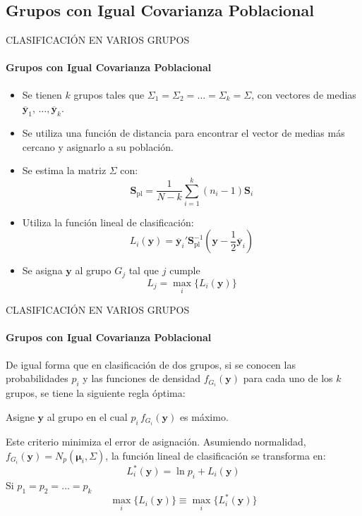 \subsection{Grupos con Igual Covarianza Poblacional}
\begin{frame}{CLASIFICACIÓN EN VARIOS GRUPOS}
\framesubtitle{Grupos con Igual Covarianza Poblacional}
    \begin{itemize}
        \item Se tienen $k$ grupos tales que $\Sigma_1=\Sigma_2=\dots=\Sigma_k=\Sigma$, con vectores de medias $\mathbf{\overbar{y}}_1,\,\dots,\mathbf{\overbar{y}}_k$.
        \item Se utiliza una función de distancia para encontrar el vector de medias más cercano y asignarlo a su población.
        \item Se estima la matriz $\Sigma$ con:
        \begin{equation}
         \mathbf{S}_{\text{pl}}=\dfrac{1}{N-k}\sum_{i=1}^k(n_i-1)\mathbf{S}_i
        \end{equation}
        \item Utiliza la función lineal de clasificación:
        \begin{equation}
            L_i(\mathbf{y})=\mathbf{\overbar{y}}_i'\mathbf{S}_{\text{pl}}^{-1}\left(\mathbf{y}-\dfrac{1}{2}\mathbf{\overbar{y}}_i\right)
        \end{equation}
        \item Se asigna $\mathbf{y}$ al grupo $G_{j}$ tal que $j$ cumple
        \begin{equation}
            L_j=\max_{i}\{L_i(\mathbf{y})\}
        \end{equation}
    \end{itemize}
\end{frame}

\begin{frame}{CLASIFICACIÓN EN VARIOS GRUPOS}
    \framesubtitle{Grupos con Igual Covarianza Poblacional}
    De igual forma que en clasificación de dos grupos, si se conocen las probabilidades $p_i$ y las funciones de densidad $f_{G_i}(\mathbf{y})$ para cada uno de los $k$ grupos, se tiene la siguiente regla óptima:
    \begin{center}
        Asigne $\mathbf{y}$ al grupo en el cual $p_i\,f_{G_i}(\mathbf{y})$ es máximo.
    \end{center}
    Este criterio minimiza el error de asignación. Asumiendo normalidad, $f_{G_i}(\mathbf{y})=N_p(\pmb{\mu}_i,\Sigma)$, la función lineal de clasificación se transforma en:
    \begin{equation}
        L^*_i(\mathbf{y})=\ln p_i + L_i(\mathbf{y})
    \end{equation}
    Si $p_1=p_2=\dots=p_k$
    \begin{equation}
        \max_{i}\{L_i(\mathbf{y})\} \equiv \max_{i}\{L_i^*(\mathbf{y})\}
    \end{equation}
\end{frame}

